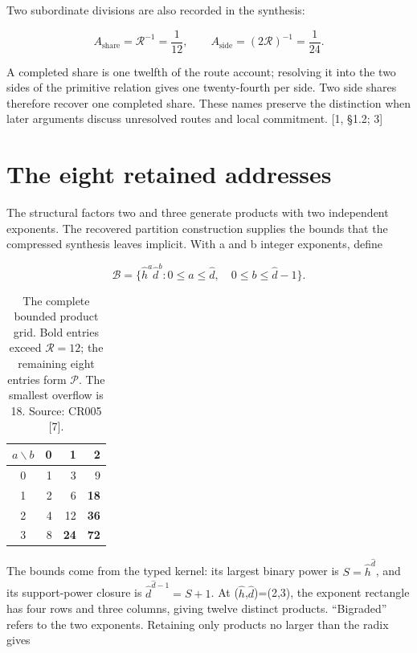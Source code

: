 \documentclass[10pt,twocolumn,letterpaper]{article}
\begin{document}
Two subordinate divisions are also recorded in the synthesis:

\begin{equation}
A_{\mathrm{share}}=\mathcal R^{-1}=\frac1{12},
\qquad
A_{\mathrm{side}}=(2\mathcal R)^{-1}=\frac1{24}.
\end{equation}

A completed share is one twelfth of the route account; resolving it into the two sides of the primitive relation gives one twenty-fourth per side. Two side shares therefore recover one completed share. These names preserve the distinction when later arguments discuss unresolved routes and local commitment. {[}1, §1.2; 3{]}

\newpage
\section{The eight retained addresses}\label{the-eight-retained-addresses}

The structural factors two and three generate products with two independent exponents. The recovered partition construction supplies the bounds that the compressed synthesis leaves implicit. With a and b integer exponents, define

\begin{equation}
\mathcal B=\{\hat h^a\hat d^b:
0\le a\le\hat d,\quad0\le b\le\hat d-1\}.
\end{equation}

\begin{table}[ht]
\centering\small
\caption{The complete bounded product grid. Bold entries exceed $\mathcal R=12$; the remaining eight entries form $\mathcal P$. The smallest overflow is 18. Source: CR005 [7].}
\begin{tabular}{@{}crrr@{}}\toprule
$a\backslash b$&0&1&2\\\midrule
0&1&3&9\\
1&2&6&\textbf{18}\\
2&4&12&\textbf{36}\\
3&8&\textbf{24}&\textbf{72}\\\bottomrule
\end{tabular}
\end{table}
The bounds come from the typed kernel: its largest binary power is \(S=\hat h^{\hat d}\), and its support-power closure is \(\hat d^{\hat d-1}=S+1\). At (\(\hat h\),\(\hat d\))=(2,3), the exponent rectangle has four rows and three columns, giving twelve distinct products. ``Bigraded'' refers to the two exponents. Retaining only products no larger than the radix gives
\end{document}
